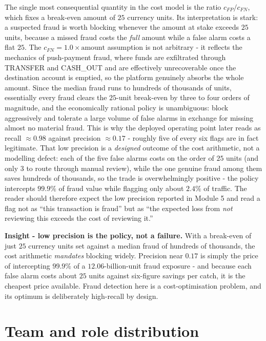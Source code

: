 \documentclass[11pt,a4paper]{report}
\begin{document}
The single most consequential quantity in the cost model is the ratio $c_{FP}/c_{FN}$, which fixes a break-even amount of $25$ currency units. Its interpretation is stark: a suspected fraud is worth blocking whenever the amount at stake exceeds $25$ units, because a missed fraud costs the \emph{full} amount while a false alarm costs a flat $25$. The $c_{FN}=1.0\times\text{amount}$ assumption is not arbitrary - it reflects the mechanics of push-payment fraud, where funds are exfiltrated through TRANSFER and CASH\_OUT and are effectively unrecoverable once the destination account is emptied, so the platform genuinely absorbs the whole amount. Since the median fraud runs to hundreds of thousands of units, essentially every fraud clears the $25$-unit break-even by three to four orders of magnitude, and the economically rational policy is unambiguous: block aggressively and tolerate a large volume of false alarms in exchange for missing almost no material fraud. This is why the deployed operating point later reads as recall $\approx 0.98$ against precision $\approx 0.17$ - roughly five of every six flags are in fact legitimate. That low precision is a \emph{designed} outcome of the cost arithmetic, not a modelling defect: each of the five false alarms costs on the order of $25$ units (and only $3$ to route through manual review), while the one genuine fraud among them saves hundreds of thousands, so the trade is overwhelmingly positive - the policy intercepts $99.9\%$ of fraud value while flagging only about $2.4\%$ of traffic. The reader should therefore expect the low precision reported in Module 5 and read a flag not as ``this transaction is fraud'' but as ``the expected loss from \emph{not} reviewing this exceeds the cost of reviewing it.''

\begin{keybox}
\textbf{Insight - low precision is the policy, not a failure.} With a break-even of just $25$ currency units set against a median fraud of hundreds of thousands, the cost arithmetic \emph{mandates} blocking widely. Precision near $0.17$ is simply the price of intercepting $99.9\%$ of a $12.06$-billion-unit fraud exposure - and because each false alarm costs about $25$ units against six-figure savings per catch, it is the cheapest price available. Fraud detection here is a cost-optimisation problem, and its optimum is deliberately high-recall by design.
\end{keybox}

\section{Team and role distribution}
\end{document}
